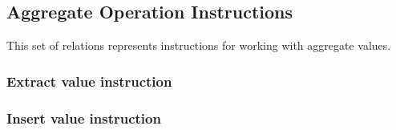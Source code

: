 \subsection{Aggregate Operation Instructions}
This set of relations represents instructions for working with aggregate values.

\subsubsection{Extract value instruction}

\subsubsection{Insert value instruction}

